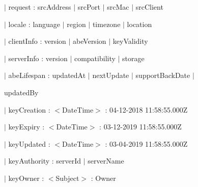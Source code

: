 \documentclass[a4paper,11pt]{article}
\begin{document}
\hspace{1.05cm}$|$ request : srcAddress $|$ srcPort $|$ srcMac $|$ srcClient \par
\hspace{1.05cm}$|$ locale : language $|$ region $|$ timezone $|$ location \par
\hspace{1.05cm}$|$ clientInfo : version $|$ abeVersion $|$ keyValidity \par
\hspace{1.05cm}$|$ serverInfo : version $|$ compatibility $|$ storage \par
\hspace{1.05cm}$|$ abeLifespan : updatedAt $|$ nextUpdate $|$ supportBackDate $|$ \par
\hspace{3.69cm}updatedBy \par
\hspace{1.05cm}$|$ keyCreation : $<$DateTime$>$ : 04-12-2018 11:58:55.000Z \par
\hspace{1.05cm}$|$ keyExpiry : $<$DateTime$>$ : 03-12-2019 11:58:55.000Z \par
\hspace{1.05cm}$|$ keyUpdated : $<$DateTime$>$ : 03-04-2019 11:58:55.000Z \par
\hspace{1.05cm}$|$ keyAuthority : serverId $|$ serverName \par
\hspace{1.05cm}$|$ keyOwner : $<$Subject$>$ : Owner \par
\end{document}
